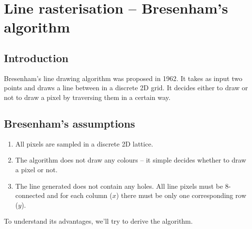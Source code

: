 \documentclass[a4paper]{article}
\begin{document}






\newpage
\tableofcontents
\newpage



\section{Line rasterisation -- Bresenham's algorithm}


\subsection{Introduction}
Bresenham's line drawing algorithm was proposed in 1962. It takes as input two points and draws a line between in a discrete 2D grid. It decides either to draw or not to draw a pixel by traversing them in a certain way.


\subsection{Bresenham's assumptions}

\begin{enumerate}
	\item All pixels are sampled in a discrete 2D lattice.
	\item The algorithm does not draw any colours -- it simple decides whether to draw a pixel or not.
	\item The line generated does not contain any holes. All line pixels must be 8-connected and for each column ($x$) there must be only one corresponding row ($y$). 
\end{enumerate}
To understand its advantages, we'll try to derive the algorithm.
\end{document}
